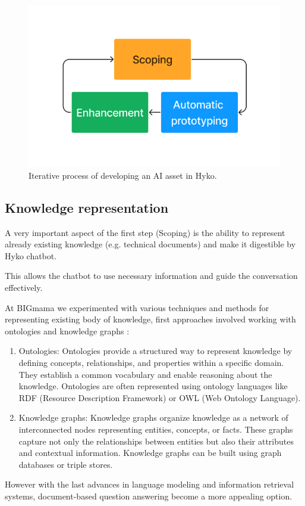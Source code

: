 \documentclass[a4paper,12pt]{article}
\begin{document}
\begin{figure}[h]
	\centering
	\includegraphics[width=.5\linewidth]{figures/3process.png}
	\caption{Iterative process of developing an AI asset in Hyko.}
	\label{fig:hykoprocess}
\end{figure}

\subsection{Knowledge representation}
A very important aspect of the first step (Scoping) is the ability to represent already existing knowledge (e.g. technical documents) 
and make it digestible by Hyko chatbot. 

This allows the chatbot to use necessary information and guide the conversation effectively.

At BIGmama we experimented with various techniques and methods for representing existing body of knowledge, 
first approaches involved working with ontologies and knowledge graphs :

\begin{enumerate}
	\item Ontologies: Ontologies provide a structured way to represent knowledge by defining concepts, relationships, and properties within a specific domain. They establish a common vocabulary and enable reasoning about the knowledge. 
	      Ontologies are often represented using ontology languages like RDF (Resource Description Framework) or OWL (Web Ontology Language).
	\item Knowledge graphs: Knowledge graphs organize knowledge as a network of interconnected nodes representing entities, concepts, or facts. 
	      These graphs capture not only the relationships between entities but also their attributes and contextual information. Knowledge graphs can be built using graph databases or triple stores.
\end{enumerate}

However with the last advances in language modeling and information retrieval systems, document-based question answering become a more appealing option.  
\end{document}
